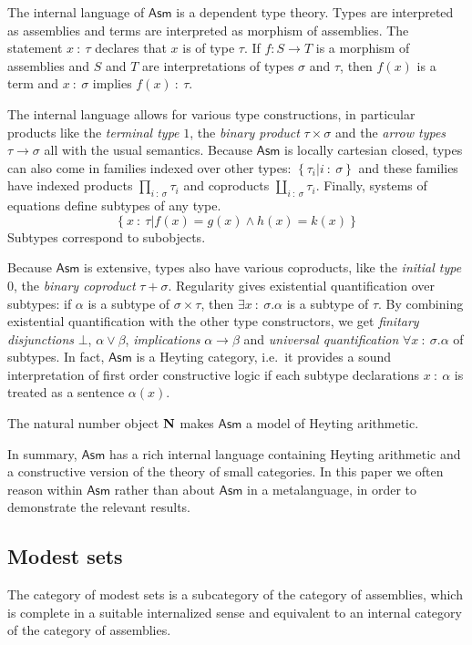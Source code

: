 \documentclass{amsart}
\theoremstyle{plain}
\theoremstyle{definition}
\newcommand\set[1]{\left\{#1\right\}}
\newcommand\Asm{\mathsf{Asm}}
\begin{document}
\newcommand\of{\mathord{\ :\ }}
The internal language of $\Asm$ is a dependent type theory. Types are interpreted as assemblies and terms are interpreted as morphism of assemblies. The statement $x\of\tau$ declares that $x$ is of type $\tau$. If $f:S\to T$ is a morphism of assemblies and $S$ and $T$ are interpretations of types $\sigma$ and $\tau$, then $f(x)$ is a term and $x\of \sigma$ implies $f(x)\of \tau$.  

The internal language allows for various type constructions, in particular products like the \emph{terminal type} $1$, the \emph{binary product} $\tau\times\sigma$ and the \emph{arrow types} $\tau\to\sigma$ all with the usual semantics. Because $\Asm$ is locally cartesian closed, types can also come in families indexed over other types: $\set{\tau_i|i\of \sigma}$ and these families have indexed products $\prod_{i\of \sigma} \tau_i$ and coproducts $\coprod_{i\of \sigma} \tau_i$. Finally, systems of equations define subtypes of any type. \[\set{x\of\tau| f(x)=g(x)\land h(x)=k(x)} \] Subtypes correspond to subobjects.

Because $\Asm$ is extensive, types also have various coproducts, like the \emph{initial type} 0, the \emph{binary coproduct} $\tau+\sigma$. Regularity gives existential quantification over subtypes: if $\alpha$ is a subtype of $\sigma\times\tau$, then $\exists x\of\sigma.\alpha$ is a subtype of $\tau$. By combining existential quantification with the other type constructors, we get \emph{finitary disjunctions} $\bot$, $\alpha\vee \beta$, \emph{implications} $\alpha\to \beta$ and \emph{universal quantification} $\forall x\of\sigma.\alpha$ of subtypes. In fact, $\Asm$ is a Heyting category, i.e.\ it provides a sound interpretation of first order constructive logic if each subtype declarations $x\of \alpha$ is treated as a sentence $\alpha(x)$.

The natural number object $\mathbf N$ makes $\Asm$ a model of Heyting arithmetic. 

In summary, $\Asm$ has a rich internal language containing Heyting arithmetic and a constructive version of the theory of small categories. In this paper we often reason within $\Asm$ rather than about $\Asm$ in a metalanguage, in order to demonstrate the relevant results.

\subsection{Modest sets}
The category of modest sets is a subcategory of the category of assemblies, which is complete in a suitable internalized sense and equivalent to an internal category of the category of assemblies.
\end{document}
